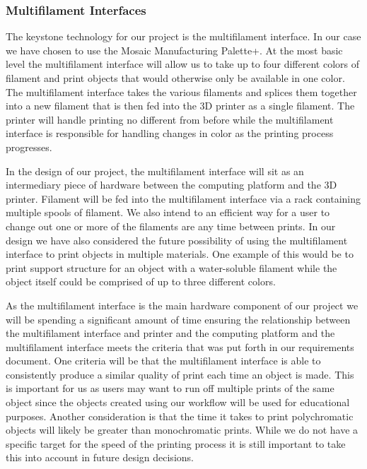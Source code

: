 \documentclass[letterpaper, onecolumn, draftclsnofoot, 10pt, compsoc]{IEEEtran}
\begin{document}
\begin{singlespace}
        \subsubsection{Multifilament Interfaces}
        	The keystone technology for our project is the multifilament interface. In our case we have chosen to use the Mosaic Manufacturing Palette+. At the most basic level the multifilament interface will allow us to take up to four different colors of filament and print objects that would otherwise only be available in one color. The multifilament interface takes the various filaments and splices them together into a new filament that is then fed into the 3D printer as a single filament. The printer will handle printing no different from before while the multifilament interface is responsible for handling changes in color as the printing process progresses.\cite{palette+}\par
In the design of our project, the multifilament interface will sit as an intermediary piece of hardware between the computing platform and the 3D printer. Filament will be fed into the multifilament interface via a rack containing multiple spools of filament. We also intend to an efficient way for a user to change out one or more of the filaments are any time between prints. In our design we have also considered the future possibility of using the multifilament interface to print objects in multiple materials. One example of this would be to print support structure for an object with a water-soluble filament while the object itself could be comprised of up to three different colors.\par
As the multifilament interface is the main hardware component of our project we will be spending a significant amount of time ensuring the relationship between the multifilament interface and printer and the computing platform and the multifilament interface meets the criteria that was put forth in our requirements document. One criteria will be that the multifilament interface is able to consistently produce a similar quality of print each time an object is made. This is important for us as users may want to run off multiple prints of the same object since the objects created using our workflow will be used for educational purposes. Another consideration is that the time it takes to print polychromatic objects will likely be greater than monochromatic prints. While we do not have a specific target for the speed of the printing process it is still important to take this into account in future design decisions.\par

\end{singlespace}
\end{document}
